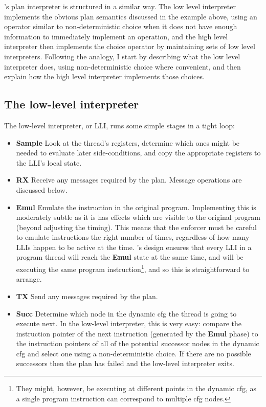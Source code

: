 {\Implementation}'s plan interpreter is structured in a similar way.
The low level interpreter implements the obvious plan semantics
discussed in the example above, using an operator similar to
non-deterministic choice when it does not have enough information to
immediately implement an operation, and the high level interpreter
then implements the choice operator by maintaining sets of low level
interpreters.  Following the analogy, I start by describing what the
low level interpreter does, using non-deterministic choice where
convenient, and then explain how the high level interpreter implements
those choices.

\subsection{The low-level interpreter}
\label{sect:enforce:llis}

The low-level interpreter, or LLI, runs some simple stages in a tight
loop:

\begin{itemize}
\item \textbf{Sample} Look at the thread's registers, determine which
  ones might be needed to evaluate later side-conditions, and copy the
  appropriate registers to the LLI's local state.

\item \textbf{RX} Receive any messages required by the plan.  Message
  operations are discussed below.

\item \textbf{Emul} Emulate the instruction in the original program.
  Implementing this is moderately subtle as it is has effects which
  are visible to the original program (beyond adjusting the timing).
  This means that the enforcer must be careful to emulate instructions
  the right number of times, regardless of how many LLIs happen to be
  active at the time.  {\Technique}'s design ensures that every LLI in
  a program thread will reach the \textbf{Emul} state at the same
  time, and will be executing the same program
  instruction\footnote{They might, however, be executing at different
    points in the dynamic \gls{cfg}, as a single program instruction
    can correspond to multiple \gls{cfg} nodes.}, and so this is
  straightforward to arrange.  

\item \textbf{TX} Send any messages required by the plan.

\item \textbf{Succ} Determine which node in the dynamic \gls{cfg} the
  thread is going to execute next.  In the low-level interpreter, this
  is very easy: compare the instruction pointer of the next
  instruction (generated by the \textbf{Emul} phase) to the
  instruction pointers of all of the potential successor nodes in the
  dynamic \gls{cfg} and select one using a non-deterministic choice.
  If there are no possible successors then the plan has failed and the
  low-level interpreter exits.
\end{itemize}

